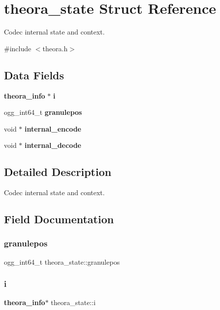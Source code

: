 \section{theora\+\_\+state Struct Reference}
\label{structtheora__state}


Codec internal state and context.  




{\ttfamily \#include $<$theora.\+h$>$}

\subsection*{Data Fields}
\begin{DoxyCompactItemize}
\item 
\textbf{ theora\+\_\+info} $\ast$ \textbf{ i}
\item 
ogg\+\_\+int64\+\_\+t \textbf{ granulepos}
\item 
void $\ast$ \textbf{ internal\+\_\+encode}
\item 
void $\ast$ \textbf{ internal\+\_\+decode}
\end{DoxyCompactItemize}


\subsection{Detailed Description}
Codec internal state and context. 

\subsection{Field Documentation}
\mbox{\label{structtheora__state_a5dd344a3f79ea7501b18c756772fab7b}} 
\subsubsection{granulepos}
{\footnotesize\ttfamily ogg\+\_\+int64\+\_\+t theora\+\_\+state\+::granulepos}

\mbox{\label{structtheora__state_a0efc7ac581ef260b0ca17f518ace0731}} 
\subsubsection{i}
{\footnotesize\ttfamily \textbf{ theora\+\_\+info}$\ast$ theora\+\_\+state\+::i}

